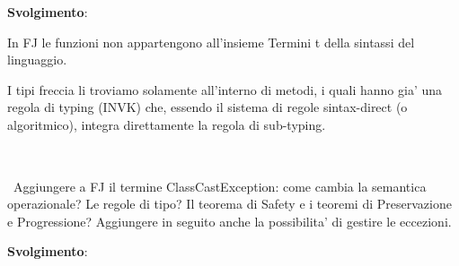 \vspace{0,5cm}
\noindent
\textbf{Svolgimento}:

\vspace{0,3cm}
In FJ le funzioni non appartengono all'insieme Termini t della sintassi del linguaggio.

I tipi freccia li troviamo solamente all'interno di metodi, i quali hanno gia' una regola di typing (INVK) che, essendo il sistema di  regole sintax-direct (o algoritmico), integra direttamente la regola di sub-typing.

\vspace{1cm}			 
\subsection*{}\
\\
\
Aggiungere a FJ il termine ClassCastException: come cambia la semantica operazionale? Le regole di tipo? Il teorema di Safety e i teoremi di Preservazione e Progressione? Aggiungere
in seguito anche la possibilita' di gestire le eccezioni.

\vspace{0,5cm}
\noindent
\textbf{Svolgimento}:
 